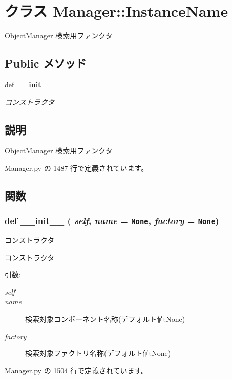 \section{クラス Manager::InstanceName}
\label{classsource__py_1_1_manager_1_1_manager_1_1_instance_name}
ObjectManager 検索用ファンクタ  


\subsection*{Public メソッド}
\begin{CompactItemize}
\item 
def {\bf \_\-\_\-init\_\-\_\-}
\begin{CompactList}\small\item\em コンストラクタ \item\end{CompactList}\end{CompactItemize}


\subsection{説明}
ObjectManager 検索用ファンクタ 

 Manager.py の 1487 行で定義されています。

\subsection{関数}
\subsubsection{\setlength{\rightskip}{0pt plus 5cm}def \_\-\_\-init\_\-\_\- ( {\em self},  {\em name} = {\tt None},  {\em factory} = {\tt None})}\label{classsource__py_1_1_manager_1_1_manager_1_1_instance_name_c775ee34451fdfa742b318538164070e}


コンストラクタ 

コンストラクタ

\begin{Desc}
\item[引数:]
\begin{description}
\item[{\em self}]\item[{\em name}]検索対象コンポーネント名称(デフォルト値:None) \item[{\em factory}]検索対象ファクトリ名称(デフォルト値:None) \end{description}
\end{Desc}


 Manager.py の 1504 行で定義されています。